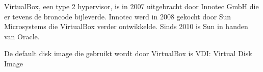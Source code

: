 VirtualBox, een type 2 hypervisor, is in 2007 uitgebracht door Innotec GmbH die er tevens de broncode bijleverde. Innotec werd in 2008 gekocht door Sun Microsystems die VirtualBox verder ontwikkelde. Sinds 2010 is Sun in handen van Oracle.

De default disk image die gebruikt wordt door VirtualBox is VDI: Virtual Disk Image

